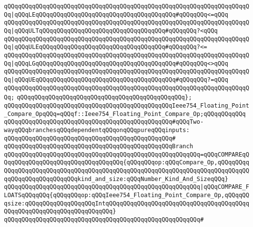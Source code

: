 \verb|qQQqqQQqqQQqqQQqqQQqqQQqqQQqqQQqqQQqqQQqqQQqqQQqqQQqqQQqqQQqqQQqqQQqqQQq|\verb#|qQQqLEqQQqqQQqqQQqqQQqqQQqqQQqqQQqqQQqqQQqqQQq#\verb|#qQQqqQQq<=qQQq|\newline
\verb|qQQqqQQqqQQqqQQqqQQqqQQqqQQqqQQqqQQqqQQqqQQqqQQqqQQqqQQqqQQqqQQqqQQqqQQq|\verb#|qQQqULTqQQqqQQqqQQqqQQqqQQqqQQqqQQqqQQqqQQq#\verb|#qQQqqQQq?<qQQq|\newline
\verb|qQQqqQQqqQQqqQQqqQQqqQQqqQQqqQQqqQQqqQQqqQQqqQQqqQQqqQQqqQQqqQQqqQQqqQQq|\verb#|qQQqULEqQQqqQQqqQQqqQQqqQQqqQQqqQQqqQQqqQQq#\verb|#qQQqqQQq?<=|\newline
\verb|qQQqqQQqqQQqqQQqqQQqqQQqqQQqqQQqqQQqqQQqqQQqqQQqqQQqqQQqqQQqqQQqqQQqqQQq|\verb#|qQQqLGqQQqqQQqqQQqqQQqqQQqqQQqqQQqqQQqqQQqqQQq#\verb|#qQQqqQQq<>qQQq|\newline
\verb|qQQqqQQqqQQqqQQqqQQqqQQqqQQqqQQqqQQqqQQqqQQqqQQqqQQqqQQqqQQqqQQqqQQqqQQq|\verb#|qQQqUEqQQqqQQqqQQqqQQqqQQqqQQqqQQqqQQqqQQqqQQq#\verb|#qQQqqQQq?=qQQq|\newline
\verb|qQQqqQQqqQQqqQQqqQQqqQQqqQQqqQQqqQQqqQQqqQQqqQQqqQQqqQQqqQQqqQQqqQQqqQQq;|\newline
\verb|qQQqqQQqqQQqqQQqqQQqqQQqqQQqqQQqqQQqqQQqqQQqqQQq};|\newline
\verb|qQQqqQQqqQQqqQQqqQQqqQQqqQQqqQQqqQQqqQQqqQQqqQQqIeee754_Floating_Point_Compare_OpqQQq=qQQqf::Ieee754_Floating_Point_Compare_Op;qQQqqQQqqQQq|\newline
\newline
\verb|qQQqqQQqqQQqqQQqqQQqqQQqqQQqqQQqqQQqqQQqqQQqqQQq#qQQqTwo-wayqQQqbranchesqQQqdependentqQQqonqQQqpureqQQqinputs:|\newline
\verb|qQQqqQQqqQQqqQQqqQQqqQQqqQQqqQQqqQQqqQQqqQQqqQQq#|\newline
\verb|qQQqqQQqqQQqqQQqqQQqqQQqqQQqqQQqqQQqqQQqqQQqqQQqBranch|\newline
\verb|qQQqqQQqqQQqqQQqqQQqqQQqqQQqqQQqqQQqqQQqqQQqqQQqqQQqqQQq=qQQqCOMPAREqQQqqQQqqQQqqQQqqQQqqQQqqQQqqQQqqQQq{qQQqqQQqop:qQQqCompare_Op,qQQqqQQqqQQqqQQqqQQqqQQqqQQqqQQqqQQqqQQqqQQqqQQqqQQqqQQqqQQqqQQqqQQqqQQqqQQqqQQqqQQqqQQqqQQqqQQqqQQqkind_and_size:qQQqNumber_Kind_And_SizeqQQq}|\newline
\verb|qQQqqQQqqQQqqQQqqQQqqQQqqQQqqQQqqQQqqQQqqQQqqQQqqQQqqQQq|\verb#|qQQqCOMPARE_FLOATSqQQqqQQq{qQQqqQQqop:qQQqIeee754_Floating_Point_Compare_Op,qQQqqQQqsize:qQQqqQQqqQQqqQQqqQQqIntqQQqqQQqqQQqqQQqqQQqqQQqqQQqqQQqqQQqqQQqqQQqqQQqqQQqqQQqqQQqqQQqqQQqqQQq}#\newline
\verb|qQQqqQQqqQQqqQQqqQQqqQQqqQQqqQQqqQQqqQQqqQQqqQQqqQQqqQQq#|\newline
